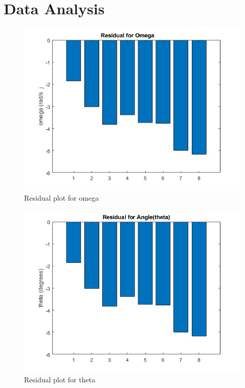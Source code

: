 \section{Data Analysis}

\newpage
\begin{figure}[h!]
    \centering
    \includegraphics[width=\textwidth]{figures/res_omega.jpg}
    \caption{Residual plot for omega}
    \label{fig:yx}
\end{figure}


\newpage
\begin{figure}[h!]
    \centering
    \includegraphics[width=\textwidth]{figures/res_theta.png}
    \caption{Residual plot for theta}
    \label{fig:yx}
\end{figure}


